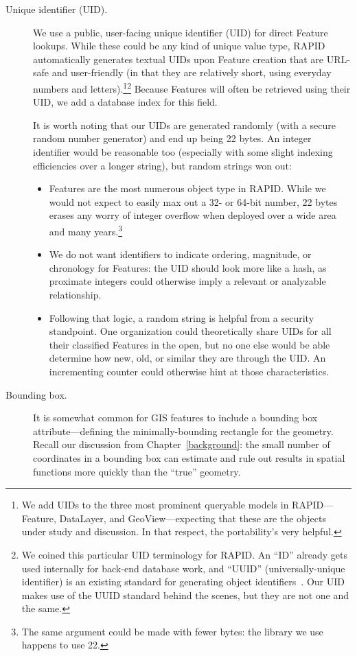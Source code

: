 \begin{description}
  \item[Unique identifier (UID).] 
  We use a public, user-facing unique identifier (UID) for direct Feature lookups. While these could be any kind of unique value type, RAPID automatically generates textual UIDs upon Feature creation that are URL-safe and user-friendly (in that they are relatively short, using everyday numbers and letters).\footnote{We add UIDs to the three most prominent queryable models in RAPID---Feature, DataLayer, and GeoView---expecting that these are the objects under study and discussion. In that respect, the portability's very helpful.}\footnote{We coined this particular UID terminology for RAPID. An ``ID'' already gets used internally for back-end database work, and ``UUID'' (universally-unique identifier) is an existing standard for generating object identifiers~\cite{Leach}. Our UID makes use of the UUID standard behind the scenes, but they are not one and the same.} Because Features will often be retrieved using their UID, we add a database index for this field.
  
It is worth noting that our UIDs are generated randomly (with a secure random number generator) and end up being 22 bytes. An integer identifier would be reasonable too (especially with some slight indexing efficiencies over a longer string), but random strings won out:
  
  \begin{itemize}
  \item Features are the most numerous object type in RAPID. While we would not expect to easily max out a 32- or 64-bit number, 22 bytes erases any worry of integer overflow when deployed over a wide area and many years.\footnote{The same argument could be made with fewer bytes: the library we use happens to use 22.}
  \item We do not want identifiers to indicate ordering, magnitude, or chronology for Features: the UID should look more like a hash, as proximate integers could otherwise imply a relevant or analyzable relationship.
  \item Following that logic, a random string is helpful from a security standpoint. One organization could theoretically share UIDs for all their classified Features in the open, but no one else would be able determine how new, old, or similar they are through the UID. An incrementing counter could otherwise hint at those characteristics.
\end{itemize}
  
\item[Bounding box.] 
  It is somewhat common for GIS features to include a bounding box attribute---defining the minimally-bounding rectangle for the geometry. Recall our discussion from Chapter~\ref{background}: the small number of coordinates in a bounding box can estimate and rule out results in spatial functions more quickly than the ``true'' geometry.


\end{description}
